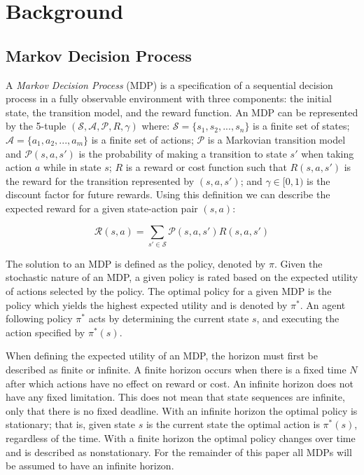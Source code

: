 \section{Background}

\subsection{Markov Decision Process}

A \emph{Markov Decision Process} (MDP) is a specification of a sequential decision process in a fully observable environment with three components: the initial state, the transition model, and the reward function. An MDP can be represented by the 5-tuple $(\mathcal{S, A, P}, R, \gamma)$ where: $\mathcal{S} = \{s_1, s_2, ..., s_n\}$ is a finite set of states; $\mathcal{A} = \{a_1, a_2, ..., a_m\}$ is a finite set of actions; $\mathcal{P}$ is a Markovian transition model and $\mathcal{P}(s, a, s')$ is the probability of making a transition to state $s'$ when taking action $a$ while in state $s$; $R$ is a reward or cost function such that $R(s, a, s')$ is the reward for the transition represented by $(s, a, s')$; and $\gamma \in [0, 1)$ is the discount factor for future rewards. Using this definition we can describe the expected reward for a given state-action pair $(s, a)$:

\[
		\mathcal{R}(s, a) = \sum_{s' \in \mathcal{S}} \mathcal{P}(s, a, s')R(s, a, s')
\]

The solution to an MDP is defined as the policy, denoted by $\pi$. Given the stochastic nature of an MDP, a given policy is rated based on the expected utility of actions selected by the policy. The optimal policy for a given MDP is the policy which yields the highest expected utility and is denoted by $\pi^*$. An agent following policy $\pi^*$ acts by determining the current state $s$, and executing the action specified by $\pi^*(s)$.

When defining the expected utility of an MDP, the horizon must first be described as finite or infinite. A finite horizon occurs when there is a fixed time $N$ after which actions have no effect on reward or cost. An infinite horizon does not have any fixed limitation. This does not mean that state sequences are infinite, only that there is no fixed deadline. With an infinite horizon the optimal policy is stationary; that is, given state $s$ is the current state the optimal action is $\pi^*(s)$, regardless of the time. With a finite horizon the optimal policy changes over time and is described as nonstationary. For the remainder of this paper all MDPs will be assumed to have an infinite horizon.

